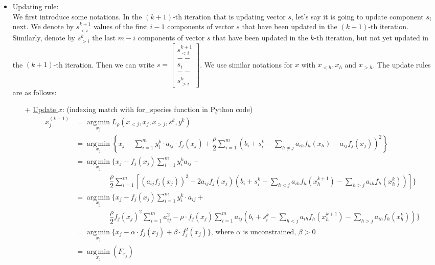 \documentclass{article}
\DeclareMathOperator*{\argmin}{arg\,min}
\begin{document}
\begin{itemize}
\item Updating rule:\\
We first introduce some notations. In the $(k+1)$-th iteration that is updating vector $s$, let's say it is going to update component $s_i$ next. We denote by $s_{<i}^{k+1}$ values of the first $i-1$ components of vector $s$ that have been updated in the $(k+1)$-th iteration. Similarly, denote by $s_{>i}^k$ the last $m-i$ components of vector $s$ that have been updated in the $k$-th iteration, but not yet updated in the $(k+1)$-th iteration. Then we can write $s = 
\begin{bmatrix}
s^{k+1}_{<i} \\
--\\
s_i\\
--\\
s^{k}_{>i}
\end{bmatrix}$. We use similar notations for $x$ with $x_{<h},x_h$ and $x_{>h}$. 
The update rules are as follows:
\begin{itemize}
    \item[+] \underline{Update $x$}: (indexing match with for\_species function in Python code)   
    \begin{align*}
        x_j^{(k+1)} &= \argmin\limits_{x_j} L_{\rho}(x_{<j},x_j,x_{>j}, s^k, y^k)\\
        &= \argmin\limits_{x_j} \left\{ x_j - \sum\limits_{i=1}^m y_i^k \cdot a_{ij} \cdot f_j(x_j) + \dfrac{\rho}{2} \sum\limits_{i=1}^m  \left(b_i+s_i^k - \sum\limits_{h\neq j} a_{ih}f_h(x_h) - a_{ij}f_j(x_j) \right)^2 \right\}\\
        &= \argmin\limits_{x_j} \biggl\{x_j - f_j(x_j)\sum_{i=1}^m y_i^k a_{ij} + \\ 
        & \hspace{2cm} \dfrac{\rho}{2}\sum\limits_{i=1}^m \left[(a_{ij}f_j(x_j))^2 - 2a_{ij}f_j(x_j) \left(b_i+s_i^k-\sum\limits_{h < j}a_{ih}f_h(x_h^{k+1}) - \sum\limits_{h > j}a_{ih}f_h(x_h^k) \right) \right]  \biggr\} \\
        &= \argmin\limits_{x_j} \biggl\{x_j - f_j(x_j)\sum\limits_{i=1}^m y_i^k\cdot a_{ij}+\\
        & \hspace{2cm} \dfrac{\rho}{2}f_j(x_j)^2\sum\limits_{i=1}^m a_{ij}^2 - \rho\cdot f_j(x_j)\sum\limits_{i=1}^m a_{ij}\left(b_i+s_i^k - \sum\limits_{h<j}a_{ih}f_h(x_h^{k+1}) - \sum\limits_{h>j}a_{ih}f_h(x_h^k) \right) \biggr\}\\
        &= \argmin\limits_{x_j} \{x_j - \alpha\cdot f_j(x_j) + \beta \cdot f_j^2(x_j) \} \text{, where } \alpha \text { is unconstrained, } \beta > 0 \\
        &= \argmin\limits_{x_j} (F_{x_j})
    \end{align*}
    

\end{itemize}
\end{itemize}
\end{document}

